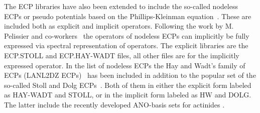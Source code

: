 The ECP libraries have also been extended to include the so-called nodeless ECPs or pseudo potentials
based on the Phillips-Kleinman equation~\cite{Phillips:59}.
These are included both as explicit and implicit operators.
Following the work by M. Pelissier and co-workers~\cite{Pelissier:1988}
the operators of nodeless ECPs can implicitly be fully expressed via spectral representation of operators.
The explicit libraries are the ECP.STOLL and ECP.HAY-WADT files, all other files are for the
implicitly expressed operator.
In the list of nodeless ECPs the Hay and Wadt's family of ECPs 
(LANL2DZ ECPs)~\cite{Hay:1985a,Hay:1985b,Hay:1985c} has been
included in addition to the popular set of the so-called Stoll and Dolg 
ECPs~\cite{ECP:1,ECP:2,ECP:3,ECP:4,ECP:5,ECP:6,ECP:7,ECP:8,
ECP:9,ECP:10,ECP:11,ECP:12,ECP:13,ECP:14,ECP:15,ECP:16,
ECP:17,ECP:18,ECP:19,ECP:20,ECP:21,ECP:22,ECP:23,ECP:24,ECP:25}. 
Both of them in either the explicit form labeled as HAY-WADT and STOLL, or in the implicit form
labeled as HW and DOLG.
The latter include the recently developed ANO-basis sets for actinides \cite{ECP:25}.

